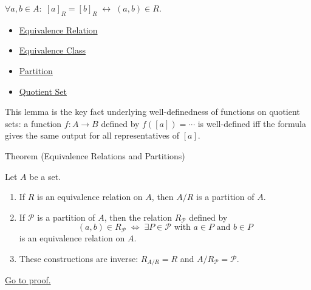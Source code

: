\begin{remark*}
$\forall a, b \in A:\; [a]_R = [b]_R \;\leftrightarrow\; (a,b)\in R$.
\end{remark*}
\begin{dependencies}
\begin{itemize}
  \item \hyperref[def:equivalence-rel]{Equivalence Relation}
  \item \hyperref[def:equiv-class]{Equivalence Class}
  \item \hyperref[def:partition]{Partition}
  \item \hyperref[def:quotient-set]{Quotient Set}
\end{itemize}
\end{dependencies}

\begin{remark*}
This lemma is the key fact underlying well-definedness of functions on quotient
sets: a function $f : A \to B$ defined by $f([a]) = \cdots$ is well-defined
iff the formula gives the same output for all representatives of $[a]$.
\end{remark*}

\begin{theorembox}{Theorem (Equivalence Relations and Partitions)}
\begin{theorem}\label{thm:equiv-partition}
Let $A$ be a set.
\begin{enumerate}[label=(\roman*)]
\item If $R$ is an equivalence relation on $A$, then $A/R$ is a partition of $A$.
\item If $\mathcal{P}$ is a partition of $A$, then the relation
$R_{\mathcal{P}}$ defined by
\[
(a,b) \in R_{\mathcal{P}} \;\Longleftrightarrow\;
\exists P \in \mathcal{P} \text{ with } a \in P \text{ and } b \in P
\]
is an equivalence relation on $A$.
\item These constructions are inverse: $R_{A/R} = R$ and $A/R_{\mathcal{P}} = \mathcal{P}$.
\end{enumerate}
\hyperref[prf:equiv-partition]{Go to proof.}
\end{theorem}
\end{theorembox}

